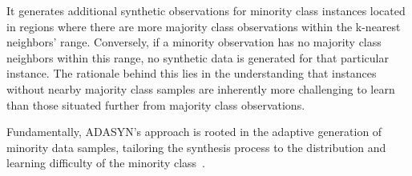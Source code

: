 It generates additional synthetic observations for minority class instances located in regions where there are more majority class observations within the k-nearest neighbors' range. Conversely, if a minority observation has no majority class neighbors within this range, no synthetic data is generated for that particular instance. The rationale behind this lies in the understanding that instances without nearby majority class samples are inherently more challenging to learn than those situated further from majority class observations.

Fundamentally, ADASYN's approach is rooted in the adaptive generation of minority data samples, tailoring the synthesis process to the distribution and learning difficulty of the minority class~\cite{Brandt2020, He2008}.









\begin{comment}
\NoCaptionOfAlgo
\begin{algorithm}[H]
\SetAlgoLined
\DontPrintSemicolon
\SetKwComment{Comment}{$\triangleright$\ }{}
\SetAlCapSkip{1em}
\SetAlCapNameFnt{\normalfont\normalsize}
\caption{Timestep $\textcolor{darkgray}{t \to t + \delta t}$}

Select a random sample of the minority class\;

\For{c in \texttt{cells}}{
    $
    \textcolor{darkgray}{r_c} :=
    \begin{cases*}
        \color{teal}{r_S} &\text{if c is sensitive} \\
        \color{purple}{r_R} &\text{if c is resistent}\\
    \end{cases*}$\;
    Total propensity $\textcolor{darkgray}{p := (r_c + d_T) \delta t}$\;
    \uIf{$\textcolor{Purple}{u < p}$}{ \tcp{cell active}
        \uIf{$\textcolor{Purple}{u < \frac{r_c \delta t}{p}}$}{
            \texttt{AttemptProliferation}\;
        }
        \Else{
            \texttt{Death}\;
        }
    } 
    \Else{  \tcp{cell inactive}
        \texttt{continue}\;
    }
}
\end{algorithm}
\end{comment}
